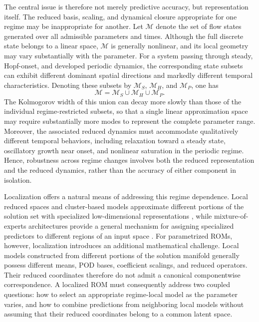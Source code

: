 The central issue is therefore not merely predictive accuracy, but representation itself. The reduced basis, scaling, and dynamical closure appropriate for one regime may be inappropriate for another.  Let $\mathcal{M}$ denote the set of flow states generated
over all admissible parameters and times. Although the full discrete state
belongs to a linear space, $\mathcal{M}$ is generally nonlinear, and its
local geometry may vary substantially with the parameter. For a system
passing through steady, Hopf-onset, and developed periodic dynamics, the
corresponding state subsets can exhibit different dominant spatial
directions and markedly different temporal characteristics. Denoting these
subsets by $\mathcal{M}_S$, $\mathcal{M}_H$, and $\mathcal{M}_P$, one has
\[
  \mathcal{M}
  =
  \mathcal{M}_S
  \cup
  \mathcal{M}_H
  \cup
  \mathcal{M}_P .
\]
The Kolmogorov width of this union can decay more slowly than those of the
individual regime-restricted subsets, so that a single linear approximation
space may require substantially more modes to represent the complete
parameter range. Moreover, the associated reduced dynamics must accommodate
qualitatively different temporal behaviors, including relaxation toward a
steady state, oscillatory growth near onset, and nonlinear saturation in the
periodic regime. Hence, robustness across regime changes involves both the
reduced representation and the reduced dynamics, rather than the accuracy of
either component in isolation.

Localization offers a natural means of addressing this regime dependence.
Local reduced spaces and cluster-based models approximate different portions
of the solution set with specialized low-dimensional representations
\cite{kaiser2014,li2021cluster}, while mixture-of-experts architectures
provide a general mechanism for assigning specialized predictors to
different regions of an input space
\cite{jacobs1991,jordan1994,shazeer2017,fedus2022}. For parametrized ROMs,
however, localization introduces an additional mathematical challenge.
Local models constructed from different portions of the solution manifold
generally possess different means, POD bases, coefficient scalings, and
reduced operators. Their reduced coordinates therefore do not admit a
canonical componentwise correspondence. A localized ROM must consequently
address two coupled questions: how to select an appropriate regime-local
model as the parameter varies, and how to combine predictions from
neighboring local models without assuming that their reduced coordinates
belong to a common latent space.



